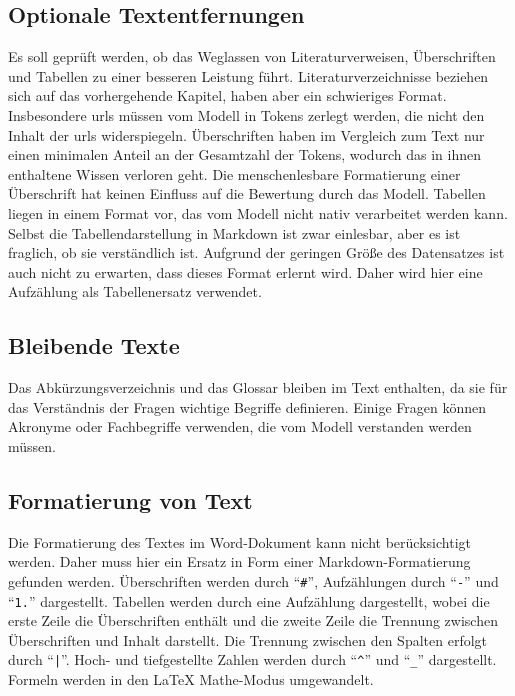 \subsection{Optionale Textentfernungen}
Es soll geprüft werden, ob das Weglassen von Literaturverweisen, Überschriften und Tabellen zu einer besseren Leistung führt.
Literaturverzeichnisse beziehen sich auf das vorhergehende Kapitel, haben aber ein schwieriges Format.
Insbesondere \ac{url}s müssen vom Modell in Tokens zerlegt werden, die nicht den Inhalt der \ac{url}s widerspiegeln. 
Überschriften haben im Vergleich zum Text nur einen minimalen Anteil an der Gesamtzahl der Tokens, wodurch das in ihnen enthaltene Wissen verloren geht.
Die menschenlesbare Formatierung einer Überschrift hat keinen Einfluss auf die Bewertung durch das Modell.
Tabellen liegen in einem Format vor, das vom Modell nicht nativ verarbeitet werden kann.
Selbst die Tabellendarstellung in Markdown ist zwar einlesbar, aber es ist fraglich, ob sie verständlich ist.
Aufgrund der geringen Größe des Datensatzes ist auch nicht zu erwarten, dass dieses Format erlernt wird.
Daher wird hier eine Aufzählung als Tabellenersatz verwendet.

\subsection{Bleibende Texte}
Das Abkürzungsverzeichnis und das Glossar bleiben im Text enthalten, da sie für das Verständnis der Fragen wichtige Begriffe definieren.
Einige Fragen können Akronyme oder Fachbegriffe verwenden, die vom Modell verstanden werden müssen.

\subsection{Formatierung von Text}
Die Formatierung des Textes im Word-Dokument kann nicht berücksichtigt werden.
Daher muss hier ein Ersatz in Form einer Markdown-Formatierung gefunden werden.
Überschriften werden durch \enquote{\texttt{\#}}, Aufzählungen durch \enquote{\texttt{-}} und \enquote{\texttt{1.}} dargestellt.
Tabellen werden durch eine Aufzählung dargestellt, wobei die erste Zeile die Überschriften enthält und die zweite Zeile die Trennung zwischen Überschriften und Inhalt darstellt.
Die Trennung zwischen den Spalten erfolgt durch \enquote{\texttt{|}}.
Hoch- und tiefgestellte Zahlen werden durch \enquote{\texttt{\^}} und \enquote{\texttt{\_}} dargestellt.
Formeln werden in den \LaTeX{} Mathe-Modus umgewandelt.

